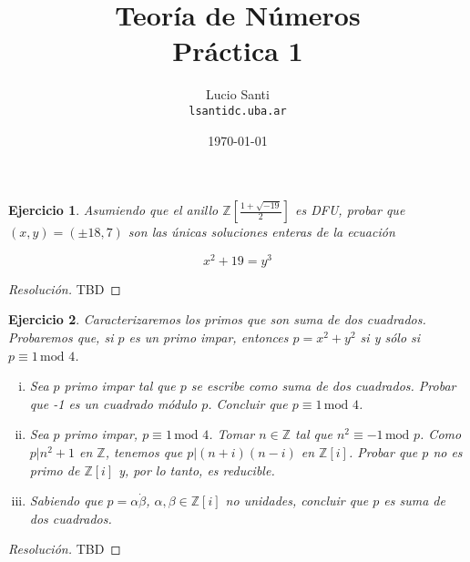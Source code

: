 \documentclass[a4paper,11pt]{article}
\title{Teoría de Números\\
      \small{Práctica 1}}
\author{Lucio Santi\\
        \texttt{lsanti\at dc.uba.ar}}
\date{\today}
\newcommand{\Zm}[1]{\ensuremath{\mathbb{Z}[#1]}}
\newcommand{\Cong}[3]{\ensuremath{#1 \equiv #2 \, \textrm{mod } #3}}
\newcommand{\Div}[2]{\ensuremath{#1 | #2}}
\newtheorem*{ej}{Ejercicio}
\begin{document}
\maketitle

\begin{ej} 
    Asumiendo que el anillo \Zm{\frac{1 + \sqrt{-19}}{2}} es DFU, probar que $(x, y) = (\pm 18, 7)$
son las únicas soluciones enteras de la ecuación

    $$x^2 + 19 = y^3$$
\end{ej}

\begin{proof}[Resoluci\'on]
TBD
\end{proof}


\begin{ej} 
Caracterizaremos los primos que son suma de dos cuadrados. Probaremos que, si $p$ es un
primo impar, entonces $p = x^2 + y^2$ si y sólo si $\Cong{p}{1}{4}$.

\begin{enumerate}[i.]
    \item Sea $p$ primo impar tal que $p$ se escribe como suma de dos cuadrados.
    Probar que -1 es un cuadrado módulo $p$. Concluir que $\Cong{p}{1}{4}$.

    \item Sea $p$ primo impar, $\Cong{p}{1}{4}$. Tomar $n \in \mathbb{Z}$ tal que
    $\Cong{n^2}{-1}{p}$. Como $\Div{p}{n^2 + 1}$ en $\mathbb{Z}$, tenemos que
    $\Div{p}{(n + i)(n - i)}$ en \Zm{i}. Probar que $p$ no es primo de \Zm{i} y, 
    por lo tanto, es reducible.

    \item Sabiendo que $p = \alpha \dot \beta$, $\alpha, \beta \in \Zm{i}$ no 
    unidades, concluir que $p$ es suma de dos cuadrados.
\end{enumerate}

\end{ej}

\begin{proof}[Resoluci\'on]
TBD
\end{proof}
\end{document}
